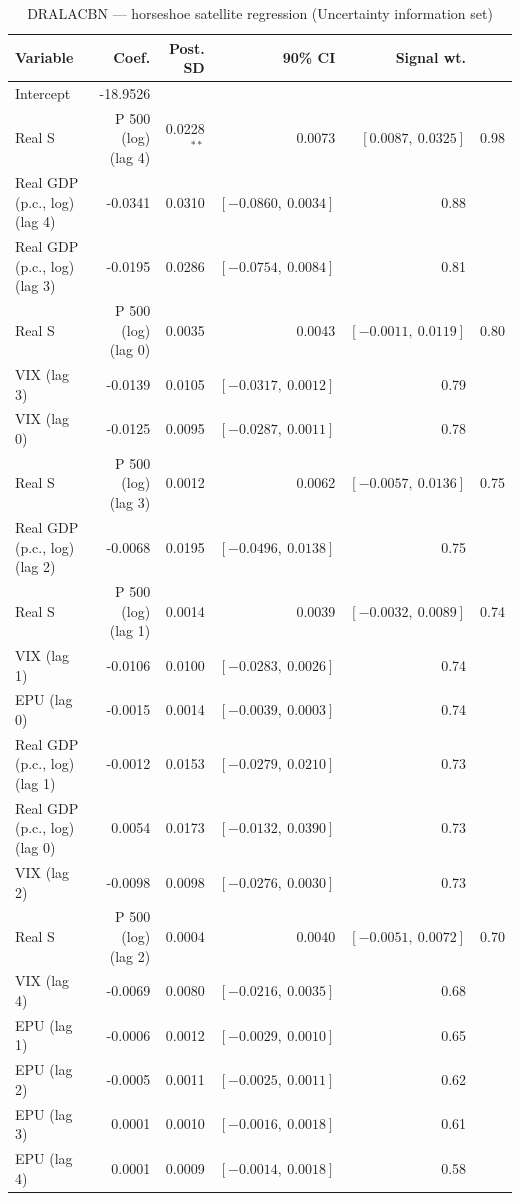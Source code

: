 \begin{table}[!htbp]
\centering
\caption{DRALACBN --- horseshoe satellite regression (Uncertainty information set)}
\label{tab:dralacbn_uncertainty_horseshoe}
\begin{tabular}{lrrrr}
\toprule
Variable & Coef. & Post. SD & 90\% CI & Signal wt. \\
\midrule
Intercept & -18.9526 & & & \\
Real S&P 500 (log) (lag 4) & 0.0228$^{**}$ & 0.0073 & $[0.0087,\ 0.0325]$ & 0.98 \\
Real GDP (p.c., log) (lag 4) & -0.0341 & 0.0310 & $[-0.0860,\ 0.0034]$ & 0.88 \\
Real GDP (p.c., log) (lag 3) & -0.0195 & 0.0286 & $[-0.0754,\ 0.0084]$ & 0.81 \\
Real S&P 500 (log) (lag 0) & 0.0035 & 0.0043 & $[-0.0011,\ 0.0119]$ & 0.80 \\
VIX (lag 3) & -0.0139 & 0.0105 & $[-0.0317,\ 0.0012]$ & 0.79 \\
VIX (lag 0) & -0.0125 & 0.0095 & $[-0.0287,\ 0.0011]$ & 0.78 \\
Real S&P 500 (log) (lag 3) & 0.0012 & 0.0062 & $[-0.0057,\ 0.0136]$ & 0.75 \\
Real GDP (p.c., log) (lag 2) & -0.0068 & 0.0195 & $[-0.0496,\ 0.0138]$ & 0.75 \\
Real S&P 500 (log) (lag 1) & 0.0014 & 0.0039 & $[-0.0032,\ 0.0089]$ & 0.74 \\
VIX (lag 1) & -0.0106 & 0.0100 & $[-0.0283,\ 0.0026]$ & 0.74 \\
EPU (lag 0) & -0.0015 & 0.0014 & $[-0.0039,\ 0.0003]$ & 0.74 \\
Real GDP (p.c., log) (lag 1) & -0.0012 & 0.0153 & $[-0.0279,\ 0.0210]$ & 0.73 \\
Real GDP (p.c., log) (lag 0) & 0.0054 & 0.0173 & $[-0.0132,\ 0.0390]$ & 0.73 \\
VIX (lag 2) & -0.0098 & 0.0098 & $[-0.0276,\ 0.0030]$ & 0.73 \\
Real S&P 500 (log) (lag 2) & 0.0004 & 0.0040 & $[-0.0051,\ 0.0072]$ & 0.70 \\
VIX (lag 4) & -0.0069 & 0.0080 & $[-0.0216,\ 0.0035]$ & 0.68 \\
EPU (lag 1) & -0.0006 & 0.0012 & $[-0.0029,\ 0.0010]$ & 0.65 \\
EPU (lag 2) & -0.0005 & 0.0011 & $[-0.0025,\ 0.0011]$ & 0.62 \\
EPU (lag 3) & 0.0001 & 0.0010 & $[-0.0016,\ 0.0018]$ & 0.61 \\
EPU (lag 4) & 0.0001 & 0.0009 & $[-0.0014,\ 0.0018]$ & 0.58 \\

\end{tabular}
\end{table}
